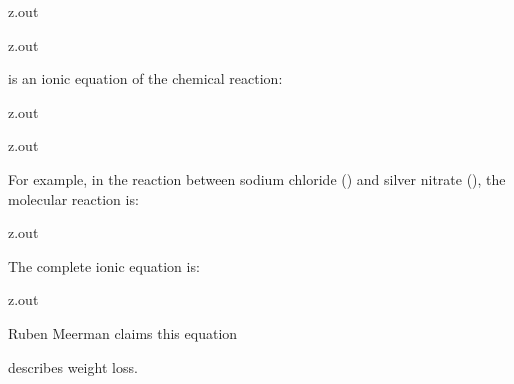 \MyIO


\begin{VerbatimOut}{z.out}

\end{VerbatimOut}

\MyIO


\begin{VerbatimOut}{z.out}

is an ionic equation of the chemical reaction:
\end{VerbatimOut}

\MyIO


\begin{VerbatimOut}{z.out}

\end{VerbatimOut}

\MyIO


\begin{VerbatimOut}{z.out}


For example, in the reaction between sodium chloride
()
and silver nitrate
(),
the molecular reaction is:

\end{VerbatimOut}

\MyIO


\begin{VerbatimOut}{z.out}

The complete ionic equation is:

\end{VerbatimOut}

\MyIO


\begin{VerbatimOut}{z.out}

Ruben Meerman \cite[starting at 5:25]{meerman} claims this equation
\begin{center}
  \endgraf
\end{center}
describes weight loss.
\end{VerbatimOut}

